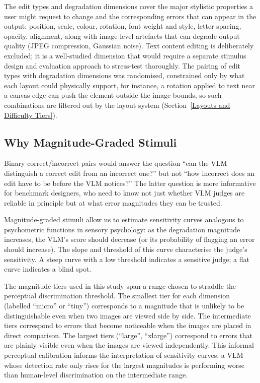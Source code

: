 The edit types and degradation dimensions cover the major stylistic properties a user might request to change and the corresponding errors that can appear in the output: position, scale, colour, rotation, font weight and style, letter spacing, opacity, alignment, along with image-level artefacts that can degrade output quality (JPEG compression, Gaussian noise). Text content editing is deliberately excluded; it is a well-studied dimension that would require a separate stimulus design and evaluation approach to stress-test thoroughly. The pairing of edit types with degradation dimensions was randomised, constrained only by what each layout could physically support, for instance, a rotation applied to text near a canvas edge can push the element outside the image bounds, so such combinations are filtered out by the layout system (Section~\ref{Layouts and Difficulty Tiers}).

\subsection{Why Magnitude-Graded Stimuli}

Binary correct/incorrect pairs would answer the question ``can the VLM distinguish a correct edit from an incorrect one?'' but not ``how incorrect does an edit have to be before the VLM notices?'' The latter question is more informative for benchmark designers, who need to know not just whether VLM judges are reliable in principle but at what error magnitudes they can be trusted.

Magnitude-graded stimuli allow us to estimate sensitivity curves analogous to psychometric functions in sensory psychology: as the degradation magnitude increases, the VLM's score should decrease (or its probability of flagging an error should increase). The slope and threshold of this curve characterise the judge's sensitivity. A steep curve with a low threshold indicates a sensitive judge; a flat curve indicates a blind spot.

The magnitude tiers used in this study span a range chosen to straddle the perceptual discrimination threshold. The smallest tier for each dimension (labelled ``micro'' or ``tiny'') corresponds to a magnitude that is unlikely to be distinguishable even when two images are viewed side by side. The intermediate tiers correspond to errors that become noticeable when the images are placed in direct comparison. The largest tiers (``large'', ``xlarge'') correspond to errors that are plainly visible even when the images are viewed independently. This informal perceptual calibration informs the interpretation of sensitivity curves: a VLM whose detection rate only rises for the largest magnitudes is performing worse than human-level discrimination on the intermediate range.

